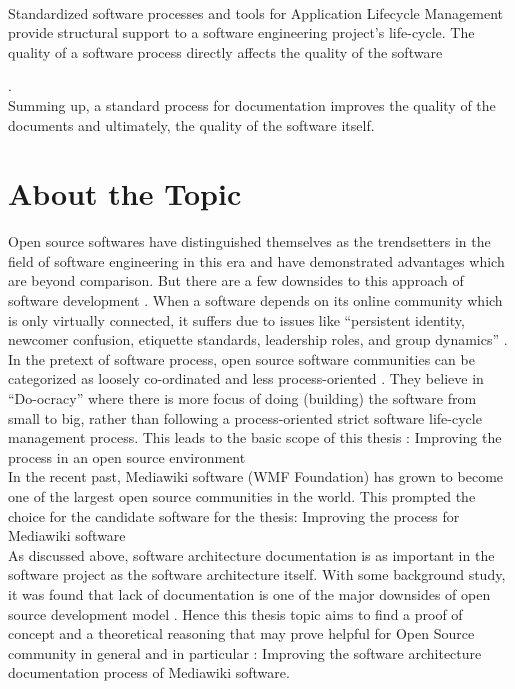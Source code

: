 \\\indent Standardized software processes and tools for Application Lifecycle Management provide structural support to a software engineering project's life-cycle. The quality of a software process directly affects the quality of the software {\cite{Fuggeffa1988}.
\\\indent Summing up, a standard process for documentation improves the quality of the documents and ultimately, the quality of the software itself.

\section{About the Topic}\label{sec:about}
\indent Open source softwares have distinguished themselves as the trendsetters in the field of software engineering in this era and have demonstrated advantages which are beyond comparison. But there are a few downsides to this approach of software development \cite{Scacchi2007}. When a software depends on its online community which is only virtually connected, it suffers due to issues like  \enquote{persistent identity, newcomer confusion, etiquette standards, leadership roles, and group dynamics} \cite{Kim:2000:CBW:518514}. In the pretext of software process, open source software communities can be categorized as loosely co-ordinated and less process-oriented \cite{Zhao2003}. They believe in \enquote{Do-ocracy} where there is more focus of doing (building) the software from small to big, rather than following a process-oriented strict software life-cycle management process. This leads to the basic scope of this thesis : Improving the process in an open source environment
\\\indent In the recent past, Mediawiki software (WMF Foundation) has grown to become one of the largest open source communities in the world. This prompted the choice for the candidate software for the thesis: Improving the process for Mediawiki software
\\\indent As discussed above, software architecture documentation is as important in the software project as the software architecture itself. With some background study, it was found that lack of documentation is one of the major downsides of open source development model \cite{6923128} \cite{Zhao2003}. Hence this thesis topic aims to find a proof of concept  and a theoretical reasoning that may prove helpful for Open Source community in general and in particular : Improving the software architecture documentation process of Mediawiki software.

}
